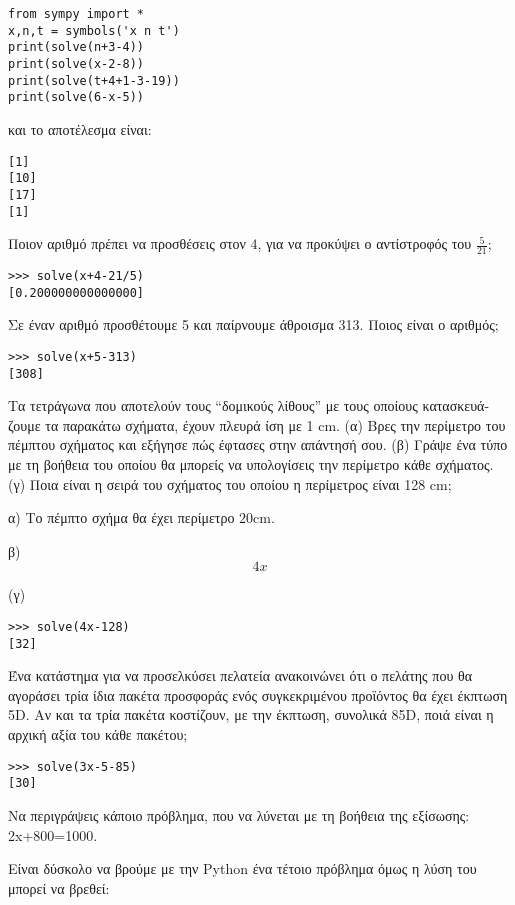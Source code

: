 \begin{lstlisting}
from sympy import *
x,n,t = symbols('x n t')
print(solve(n+3-4))
print(solve(x-2-8))
print(solve(t+4+1-3-19))
print(solve(6-x-5))
\end{lstlisting}
και το αποτέλεσμα είναι:
\begin{lstlisting}
[1]
[10]
[17]
[1]
\end{lstlisting}

\begin{exercise}
Ποιον αριθμό πρέπει να προσθέσεις στον $4$, για να προκύψει ο αντίστροφός του 
$\frac{5}{21}$;
\end{exercise}
\begin{lstlisting}
>>> solve(x+4-21/5)
[0.200000000000000]
\end{lstlisting}
\begin{exercise}
Σε έναν αριθμό προσθέτουμε 5 και παίρνουμε άθροισμα 313. Ποιος είναι ο αριθμός;
\end{exercise}
\begin{lstlisting}
>>> solve(x+5-313)
[308]
\end{lstlisting}
\begin{exercise}
Τα τετράγωνα που αποτελούν τους “δομικούς λίθους” με τους οποίους κατασκευά-
ζουμε τα παρακάτω σχήματα, έχουν πλευρά ίση με 1 cm.
(α) Bρες την περίμετρο του πέμπτου σχήματος και εξήγησε πώς έφτασες στην απάντησή σου.
(β) Γράψε ένα τύπο με τη βοήθεια του οποίου θα μπορείς να υπολογίσεις την περίμετρο κάθε σχήματος.
(γ) Ποια είναι η σειρά του σχήματος του οποίου η περίμετρος είναι 128 cm;
\end{exercise}

α) Το πέμπτο σχήμα θα έχει περίμετρο $20$cm.

β) $$4x$$

(γ) 
\begin{lstlisting}
>>> solve(4x-128)
[32]
\end{lstlisting}

\begin{exercise}
Ένα κατάστημα για να προσελκύσει πελατεία ανακοινώνει ότι ο πελάτης που θα αγοράσει τρία
ίδια πακέτα προσφοράς ενός συγκεκριμένου προϊόντος θα έχει έκπτωση 5D. Aν και τα τρία
πακέτα κοστίζουν, με την έκπτωση, συνολικά 85D, ποιά είναι η αρχική αξία του κάθε πακέτου;
\end{exercise}
\begin{lstlisting}
>>> solve(3x-5-85)
[30]
\end{lstlisting}
\begin{exercise}
Να περιγράψεις κάποιο πρόβλημα, που να λύνεται με τη βοήθεια της εξίσωσης: 2x+800=1000.
\end{exercise}
Είναι δύσκολο να βρούμε με την Python ένα τέτοιο πρόβλημα όμως η λύση του μπορεί να βρεθεί:

